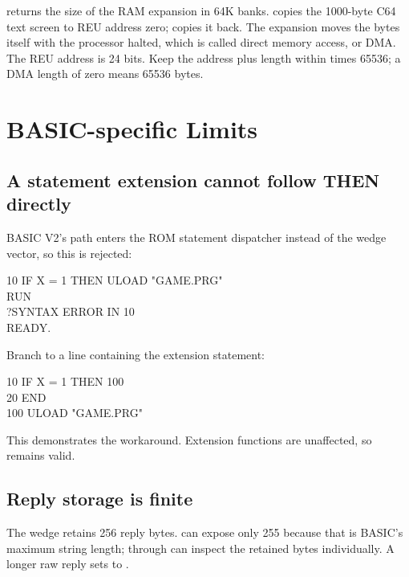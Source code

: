  returns the size of the RAM expansion in 64K banks. 
copies the 1000-byte C64 text screen to REU address zero;  copies
it back. The expansion moves the bytes itself with the processor halted, which
is called direct memory access, or DMA. The REU address is 24 bits. Keep the
address plus length within  times 65536; a DMA length of zero means
65536 bytes.


\section{BASIC-specific Limits}

\subsection*{A statement extension cannot follow THEN directly}

BASIC V2's  path enters the ROM statement dispatcher instead of the
wedge vector, so this is rejected:

\begin{screen}
10 IF X = 1 THEN ULOAD "GAME.PRG"\\
RUN\\
?SYNTAX ERROR IN 10\\
READY.
\end{screen}

Branch to a line containing the extension statement:

\begin{screen}
10 IF X = 1 THEN 100\\
20 END\\
100 ULOAD "GAME.PRG"
\end{screen}

This demonstrates the workaround. Extension functions are unaffected, so
 remains valid.

\subsection*{Reply storage is finite}

The wedge retains 256 reply bytes.  can expose only 255 because
that is BASIC's maximum string length;  through
 can inspect the retained bytes individually. A longer raw
reply sets  to .

